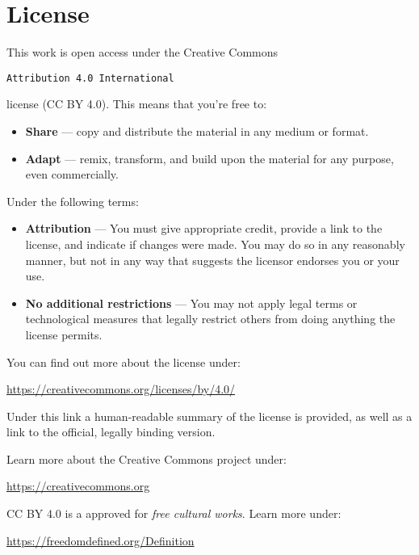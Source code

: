 \chapter*{License}
\thispagestyle{empty}
{\parindent0pt

This work is open access under the Creative Commons

\begin{center}
  \texttt{Attribution 4.0 International}
\end{center}
license (CC BY 4.0). This means that you're free
to:

\begin{itemize}

\item \textbf{Share} --- copy and distribute the material in any
  medium or format.

\item \textbf{Adapt} --- remix, transform, and build upon the material
  for any purpose, even commercially.

\end{itemize}

Under the following terms:

\begin{itemize}

\item \textbf{Attribution} --- You must give appropriate credit,
  provide a link to the license, and indicate if changes were
  made. You may do so in any reasonably manner, but not in any way
  that suggests the licensor endorses you or your use.

  \item \textbf{No additional restrictions} --- You may  not apply
    legal terms or technological measures that legally restrict others
    from doing anything the license permits.

\end{itemize}


You can find out more about the license under:

 \begin{center}
    \url{https://creativecommons.org/licenses/by/4.0/}
 \end{center}

Under this link a human-readable summary of the license is provided,
as well as a link to the official, legally binding version.

Learn more about the Creative Commons project under:

\begin{center}

\url{https://creativecommons.org}
  
\end{center}


CC BY 4.0 is a approved for \emph{free cultural works}. Learn more
under:
\begin{center}
  \url{https://freedomdefined.org/Definition}
\end{center}
}

